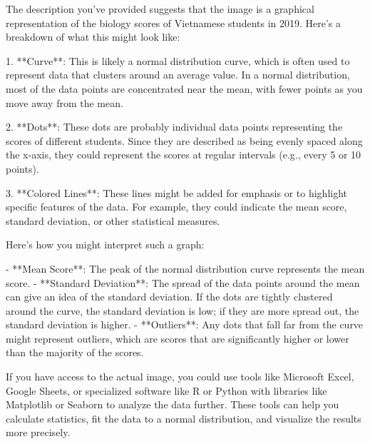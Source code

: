 The description you've provided suggests that the image is a graphical representation of the biology scores of Vietnamese students in 2019. Here’s a breakdown of what this might look like:

1. **Curve**: This is likely a normal distribution curve, which is often used to represent data that clusters around an average value. In a normal distribution, most of the data points are concentrated near the mean, with fewer points as you move away from the mean.

2. **Dots**: These dots are probably individual data points representing the scores of different students. Since they are described as being evenly spaced along the x-axis, they could represent the scores at regular intervals (e.g., every 5 or 10 points).

3. **Colored Lines**: These lines might be added for emphasis or to highlight specific features of the data. For example, they could indicate the mean score, standard deviation, or other statistical measures.

Here’s how you might interpret such a graph:

- **Mean Score**: The peak of the normal distribution curve represents the mean score.
- **Standard Deviation**: The spread of the data points around the mean can give an idea of the standard deviation. If the dots are tightly clustered around the curve, the standard deviation is low; if they are more spread out, the standard deviation is higher.
- **Outliers**: Any dots that fall far from the curve might represent outliers, which are scores that are significantly higher or lower than the majority of the scores.

If you have access to the actual image, you could use tools like Microsoft Excel, Google Sheets, or specialized software like R or Python with libraries like Matplotlib or Seaborn to analyze the data further. These tools can help you calculate statistics, fit the data to a normal distribution, and visualize the results more precisely.